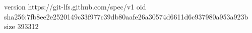 version https://git-lfs.github.com/spec/v1
oid sha256:7fb8ee2e2520149c33f977c39db80aafe26a30574d6611d6c937980a953a923b
size 393312
